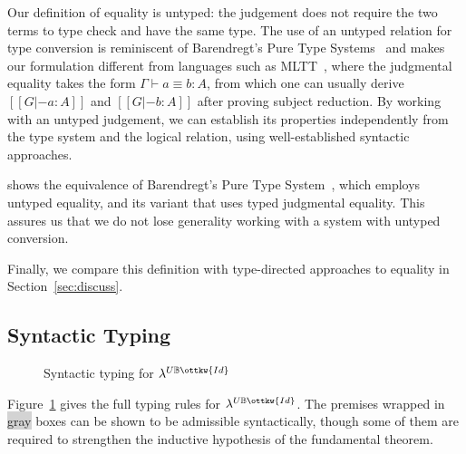 \documentclass[acmsmall,screen=true,
\ifpublic review=false\else,review=true\fi
  ,anonymous=\ifanonymous true\else false\fi]{acmart}
\newcommand{\lang}{$\lambda^{U\mathbb{B}\ottkw{Id}}$\xspace}
\newcommand{\yl}[1]{}
\begin{document}
Our definition of equality is untyped: the judgement does not require the two
terms to type check and have the same type. The use of an untyped relation for
type conversion is reminiscent of Barendregt's Pure Type
Systems~\citet{barendregt1991introduction} and makes our formulation different
from languages such as MLTT~\citep{Martin-Lof-1973}, where the judgmental
equality takes the form $\Gamma \vdash a \equiv b : A$, from which one can
usually derive $[[G |- a : A]]$ and $[[G |- b : A]]$ after proving subject
reduction. By working with an untyped judgement, we can establish its
properties independently from the type system and the logical relation, using
well-established syntactic approaches.

\citet{siles2012pure} shows the equivalence of Barendregt's Pure Type
System~\citep{barendregt1991introduction}, which employs untyped equality, and
its variant that uses typed judgmental equality. This assures us that we do
not lose generality working with a system with untyped
conversion.
\yl{removed the eta equivalence sentence because it might give the
  wrong message that we extended Siles' work with eta:
 Furthermore, discuss how this definition can be extended with
 $\eta$-equivalence of functions in Section~\ref{XXX} }
Finally, we compare this
definition with type-directed approaches to equality in
Section~\ref{sec:discuss}.


\subsection{Syntactic Typing}

\begin{figure}[h]
\begin{minipage}{0.9\textwidth}
\end{minipage}
\caption{Syntactic typing for \lang}
\label{fig:typing}
\end{figure}

Figure~\ref{fig:typing} gives the full typing rules for \lang{}. The premises
wrapped in \colorbox{lightgray}{gray} boxes can be shown to be admissible
syntactically, though some of them are required to strengthen the inductive
hypothesis of the fundamental theorem.

\yl{Var, T-Pi, T-Abs are self-explanatory now?}
\end{document}
